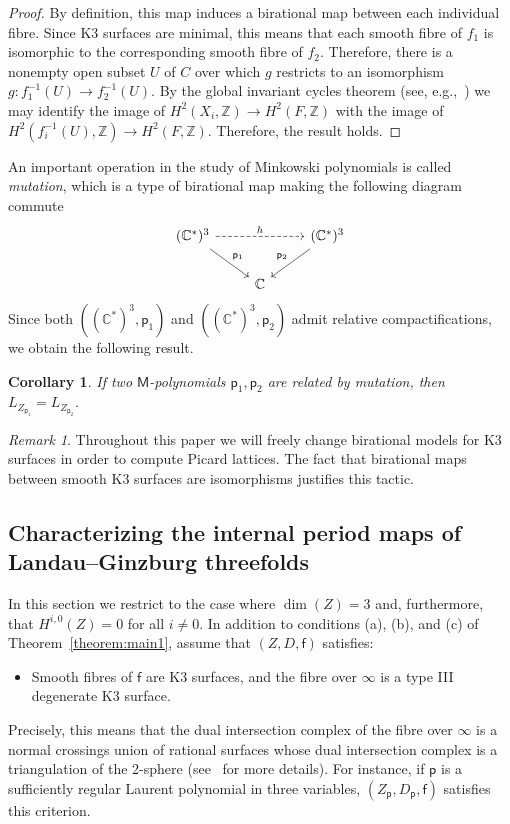 \documentclass[10pt]{amsart}
\numberwithin{equation}{section}
\theoremstyle{plain}
\newtheorem{corollary}[theorem]{Corollary}
\theoremstyle{definition}
\theoremstyle{remark}
\newtheorem{remark}[theorem]{Remark}
\begin{document}
\begin{proof}
  By definition, this map induces a birational map between each individual fibre. Since K3 surfaces are minimal, this means that each smooth fibre of \(f_1\) is isomorphic to the corresponding smooth fibre of \(f_2\). Therefore, there is a nonempty open subset \(U\) of \(C\) over which \(g\) restricts to an isomorphism \(g \colon f_1^{-1}(U) \rightarrow f_2^{-1}(U)\). By the global invariant cycles theorem (see, e.g.,~\cite[\S 4.3.3]{voisin2003hodge}) we may identify the image of \(H^2(X_i,\mathbb{Z})\rightarrow H^2(F,\mathbb{Z})\) with the image of \(H^2(f^{-1}_i(U),\mathbb{Z}) \rightarrow H^2(F,\mathbb{Z})\). Therefore, the result holds.
\end{proof}

An important operation in the study of Minkowski polynomials is called \emph{mutation}, which is a type of birational map making the following diagram commute
\[
  \begin{tikzcd}
    (\mathbb{C}^*)^3 \ar[rd,"\mathsf{p}_1"] \ar[dashed, rr,"h"] & & (\mathbb{C}^*)^3 \ar[ld,"\mathsf{p}_2",swap] \\
    & \mathbb{C} &
  \end{tikzcd}
\]
Since both \(((\mathbb{C}^*)^3,\mathsf{p}_1)\) and \(((\mathbb{C}^*)^3,\mathsf{p}_2)\) admit relative compactifications, we obtain the following result.

\begin{corollary}
  If two \(\mathsf{M}\)-polynomials \(\mathsf{p}_1,\mathsf{p}_2\) are related by mutation, then \(L_{Z_{\mathsf{p}_1}} = L_{Z_{\mathsf{p}_2}}\).
\end{corollary}

\begin{remark}
  Throughout this paper we will freely change birational models for K3 surfaces in order to compute Picard lattices. The fact that birational maps between smooth K3 surfaces are isomorphisms justifies this tactic.
\end{remark}

\subsection{Characterizing the internal period maps of Landau--Ginzburg threefolds}

In this section we restrict to the case where \(\dim(Z) = 3\) and, furthermore, that \(H^{i,0}(Z) = 0\) for all \(i \neq 0\).  In addition to conditions (a), (b), and (c) of Theorem~\ref{theorem:main1}, assume that \((Z,D,\mathsf{f})\) satisfies:
\begin{itemize}[\quad (d)]
\item Smooth fibres of \(\mathsf{f}\) are K3 surfaces, and the fibre over \(\infty\) is a type III degenerate K3 surface.
\end{itemize}
Precisely, this means that the dual intersection complex of the fibre over \(\infty\) is a normal crossings union of rational surfaces whose dual intersection complex is a triangulation of the 2-sphere (see~\cite{kulikov1977degenerations} for more details). For instance, if \(\mathsf{p}\) is a sufficiently regular Laurent polynomial in three variables, \((Z_\mathsf{p},D_\mathsf{p},\mathsf{f})\) satisfies this criterion.
\end{document}
